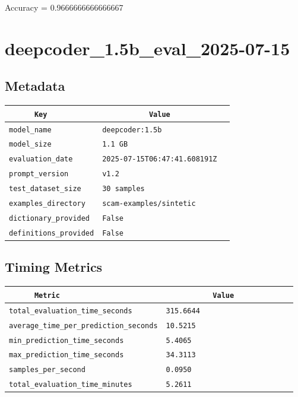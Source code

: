 \documentclass{article}
\begin{document}
\begin{center}
Accuracy = 0.9666666666666667
\end{center}

\section{deepcoder\_1.5b\_eval\_2025-07-15}
\subsection{Metadata}

\begin{center}
\begin{tabular}{l | l} \hline
    \verb|      Key      | & \verb|           Value           | \\ \hline
    \hline
    \verb|model_name    | & \verb|deepcoder:1.5b               | \\ \hline
    \verb|model_size    | & \verb|1.1 GB                       | \\ \hline
    \verb|evaluation_date| & \verb|2025-07-15T06:47:41.608191Z  | \\ \hline
    \verb|prompt_version| & \verb|v1.2                         | \\ \hline
    \verb|test_dataset_size| & \verb|30 samples                   | \\ \hline
    \verb|examples_directory| & \verb|scam-examples/sintetic       | \\ \hline
    \verb|dictionary_provided| & \verb|False                        | \\ \hline
    \verb|definitions_provided| & \verb|False                        | \\ \hline
\end{tabular}
\end{center}

\subsection{Timing Metrics}

\begin{center}
\begin{tabular}{l | l} \hline
    \verb|      Metric     | & \verb|           Value           | \\ \hline
    \hline
    \verb|total_evaluation_time_seconds| & \verb|315.6644                     | \\ \hline
    \verb|average_time_per_prediction_seconds| & \verb|10.5215                      | \\ \hline
    \verb|min_prediction_time_seconds| & \verb|5.4065                       | \\ \hline
    \verb|max_prediction_time_seconds| & \verb|34.3113                      | \\ \hline
    \verb|samples_per_second| & \verb|0.0950                       | \\ \hline
    \verb|total_evaluation_time_minutes| & \verb|5.2611                       | \\ \hline
\end{tabular}
\end{center}
\end{document}
